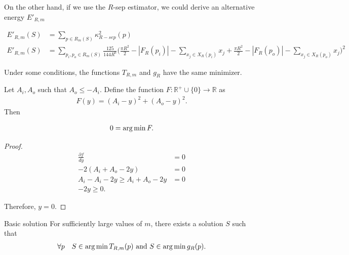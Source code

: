 On the other hand, if we use the $R$-sep estimator, we could derive an alternative energy $E'_{R,m}$

\begin{align*}
  E'_{R,m}(S) &= \sum_{p \in R_m(S)}{\kappa_{R-sep}^2(p)}\\
  E'_{R,m}(S) &= \sum_{p_i,p_o \in R_m(S)} \frac{125}{144R^6}\Big( \frac{\pi R^2}{2} - |F_{R}(p_i)| - \sum_{x_j \in X_{R}(p_{i})} {x_j} + \frac{\pi R^2}{2} - |F_{R}(p_o)| - \sum_{x_j \in X_{R}(p_{o})} {x_j} \Big)^2
\end{align*}


Under some conditions, the functions $T_{R,m}$ and $g_R$ have the same minimizer. 

\begin{lemma}
	Let $A_i,A_o$ such that $A_o \leq -A_i$. Define the function $F:\mathbb{R^+}\cup\{0\}\rightarrow \mathbb{R}$ as
	\begin{align*}
		F(y) = (A_i-y)^2 + (A_o - y)^2.
	\end{align*}
	Then 
	
	\begin{align*}
		0=\operatorname*{arg\,min} F.
	\end{align*}
	
\begin{proof}
	\begin{align*}
		\frac{\partial  f}{dy} &= 0 \\
		-2(A_i+A_o-2y) &= 0 \\
		A_i - A_i - 2y \geq A_i + A_o - 2y &= 0\\
		-2y \geq 0.
	\end{align*}
	
	Therefore, $y=0$.
\end{proof}
\end{lemma}


\begin{claim}{Basic solution}
	For sufficiently large values of $m$, there exists a solution $S$ such that
\begin{align*}
	\forall p \quad S \in \operatorname*{arg\,min} T_{R,m}(p) \text{ and } S \in \operatorname*{arg\,min} g_R(p).
\end{align*}

\end{claim}

